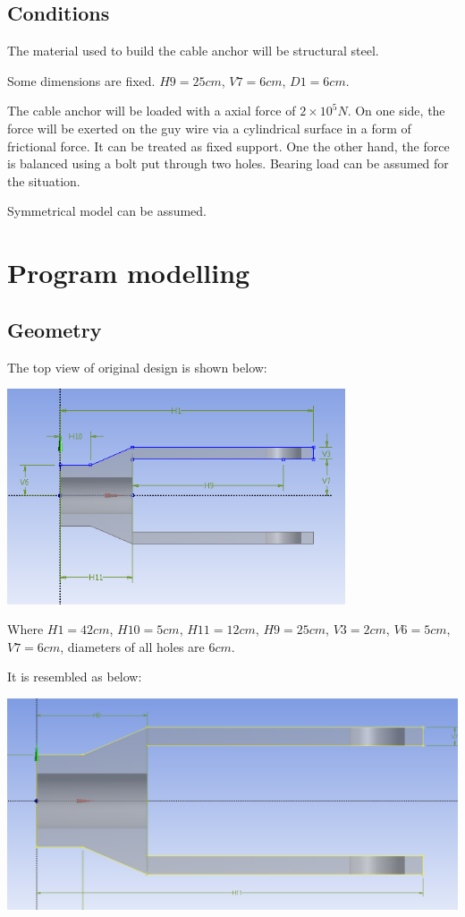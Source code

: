 \documentclass[a4paper,14pt]{extarticle}
\begin{document}
\subsection{Conditions}
The material used to build the cable anchor will be structural steel.

Some dimensions are fixed.  $H9=25cm$, $V7=6cm$, $D1 = 6cm$.

The cable anchor will be loaded with a axial force of $2\times10^5 N$. On one side, the force will be exerted on the guy wire via a cylindrical surface in a form of frictional force. It can be treated as fixed support. One the other hand, the force is balanced using a bolt put through two holes. Bearing load can be assumed for the situation.

Symmetrical model can be assumed. 
\section{Program modelling}
\subsection{Geometry}
The top view of original design is shown below:

\begin{center}\includegraphics[width=0.75\textwidth]{2D_ORIGIN.png}\end{center}

Where $H1=42cm$, $H10=5cm$, $H11=12cm$, $H9=25cm$, $V3=2cm$, $V6=5cm$, $V7=6cm$, diameters of all holes are $6cm$.

It is resembled as below:

\includegraphics[width=\textwidth]{2D_S_01.PNG}
\end{document}
